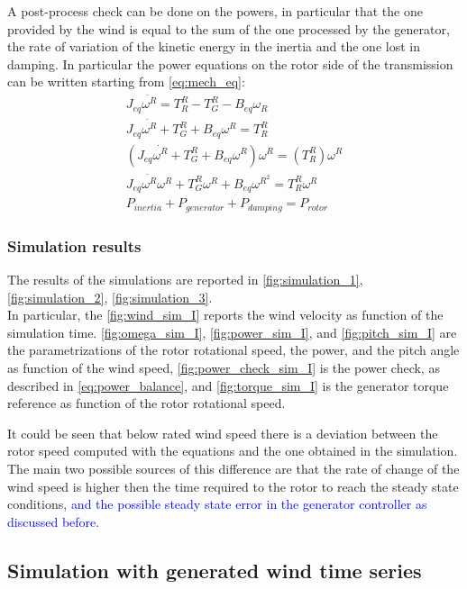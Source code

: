 A post-process check can be done on the powers, in particular that the one provided by the wind is equal to the sum of the one processed by the generator, the rate of variation of the kinetic energy in the inertia and the one lost in damping. In particular the power equations on the rotor side of the transmission can be written starting from \autoref{eq:mech_eq}:
\begin{gather}
    J_{eq}\dot{\omega^{R}} = T_R^R - T_G^R-B_{eq}\omega_R\\
    J_{eq}\dot{\omega^{R}} + T_G^R + B_{eq}\omega^R = T_R^R\\
    \left(J_{eq}\dot{\omega^{R}} + T_G^R + B_{eq}\omega^R\right)\omega^R = \left(T_R^R\right)\omega^R\\
    J_{eq}\dot{\omega^{R}}\omega^{R} + T_G^{R}\omega^{R} + B_{eq}\omega^{R^{2}} = T_R^{R}\omega^{R}\\
    P_{inertia} + P_{generator} + P_{damping} = P_{rotor} 
    \label{eq:power_balance}
\end{gather}

\subsubsection{Simulation results}
The results of the simulations are reported in \autoref{fig:simulation_1}, \ref{fig:simulation_2}, \ref{fig:simulation_3}. \\
In particular, the \autoref{fig:wind_sim_I} reports the wind velocity as function of the simulation time. \ref{fig:omega_sim_I}, \ref{fig:power_sim_I}, and \ref{fig:pitch_sim_I} are the parametrizations of the rotor rotational speed, the power, and the pitch angle as function of the wind speed, \ref{fig:power_check_sim_I} is the power check, as described in \ref{eq:power_balance}, and \ref{fig:torque_sim_I} is the generator torque reference as function of the rotor rotational speed. 


It could be seen that below rated wind speed there is a deviation between the rotor speed computed with the equations and the one obtained in the simulation. The main two possible sources of this difference are that the rate of change of the wind speed is higher then the time required to the rotor to reach the steady state conditions, \textcolor{blue}{and the possible steady state error in the generator controller as discussed before}. 

\subsection{Simulation with generated wind time series}\label{sec:wind_series_sim}
